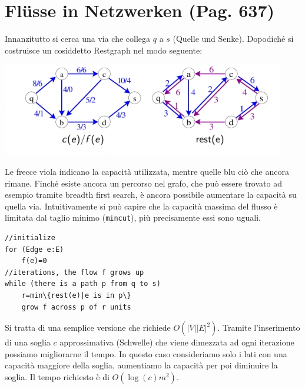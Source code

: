 \documentclass[a4paper]{book}
\newcommand{\inline}[1]{\lstinline!#1!}%
\newcommand{\lstIndent}{4}
\begin{document}
\section{Flüsse in Netzwerken (Pag. 637)}
Innanzitutto si cerca una via che collega $q$ a $s$ (Quelle und Senke). Dopodiché si costruisce un cosiddetto Restgraph nel modo seguente:
\begin{center}
\includegraphics[scale=0.8]{Figures/restgraph.jpg} 
\end{center}
Le frecce viola indicano la capacità utilizzata, mentre quelle blu ciò che ancora rimane. Finché esiste ancora un percorso nel grafo, che può essere trovato ad esempio tramite breadth first search, è ancora possibile aumentare la capacità su quella via. Intuitivamente si può capire che la capacità massima del flusso è limitata dal taglio minimo (\inline{mincut}), più precisamente essi sono uguali.
\begin{lstlisting}[tabsize=\lstIndent]
//initialize
for (Edge e:E)
	f(e)=0
//iterations, the flow f grows up
while (there is a path p from q to s)
	r=min\{rest(e)|e is in p\}
	grow f across p of r units
\end{lstlisting}
Si tratta di una semplice versione che richiede $O(|V||E|^2)$. Tramite l'inserimento di una soglia $c$ approssimativa (Schwelle) che viene dimezzata ad ogni iterazione possiamo migliorarne il tempo. In questo caso consideriamo solo i lati con una capacità maggiore della soglia, aumentiamo la capacità per poi diminuire la soglia. Il tempo richiesto è di $O(\log (c)m^2)$. 
\end{document}
